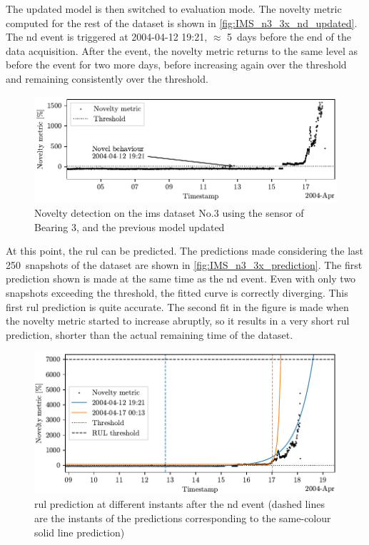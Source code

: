 The updated model is then switched to evaluation mode. The novelty metric computed for the rest of the dataset is shown in \autoref{fig:IMS_n3_3x_nd_updated}. The \gls{nd} event is triggered at 2004-04-12 19:21, $\approx$ 5~days before the end of the data acquisition. After the event, the novelty metric returns to the same level as before the event for two more days, before increasing again over the threshold and remaining consistently over the threshold.

\begin{figure}
    \centering
    \includegraphics[width=\textwidth]{images/IMS/Test03/ND.pdf}
    \caption{Novelty detection on the \gls{ims} dataset No.3 using the sensor of Bearing 3, and the previous model updated}
    \label{fig:IMS_n3_3x_nd_updated}
\end{figure}

At this point, the \gls{rul} can be predicted. The predictions made considering the last 250~snapshots of the dataset are shown in \autoref{fig:IMS_n3_3x_prediction}. The first prediction shown is made at the same time as the \gls{nd} event. Even with only two snapshots exceeding the threshold, the fitted curve is correctly diverging. This first \gls{rul} prediction is quite accurate. The second fit in the figure is made when the novelty metric started to increase abruptly, so it results in a very short \gls{rul} prediction, shorter than the actual remaining time of the dataset.

\begin{figure}
    \centering
    \includegraphics[width=\textwidth]{images/IMS/Test03/RUL.pdf}
    \caption{\gls{rul} prediction at different instants after the \gls{nd} event (dashed lines are the instants of the predictions corresponding to the same-colour solid line prediction)}
    \label{fig:IMS_n3_3x_prediction}
\end{figure}

